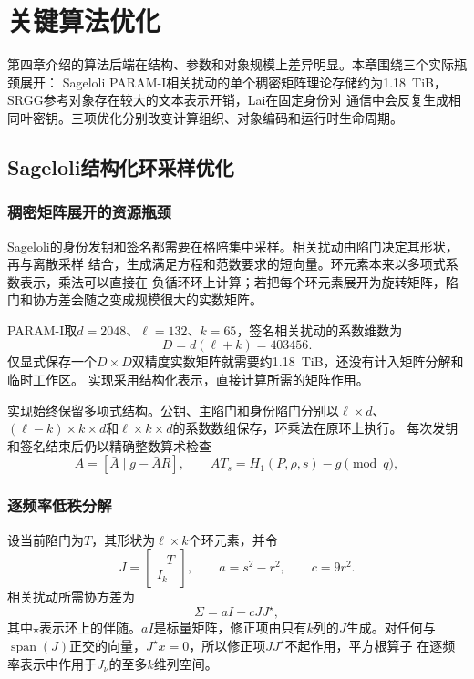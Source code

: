 \chapter{关键算法优化}
\begin{mathchapterlayout}

第四章介绍的算法后端在结构、参数和对象规模上差异明显。本章围绕三个实际瓶颈展开：
Sageloli PARAM-I相关扰动的单个稠密矩阵理论存储约为1.18~TiB，SRGG参考对象存在较大的文本表示开销，Lai在固定身份对
通信中会反复生成相同叶密钥。三项优化分别改变计算组织、对象编码和运行时生命周期。

\section{Sageloli结构化环采样优化}

\subsection{稠密矩阵展开的资源瓶颈}

Sageloli的身份发钥和签名都需要在格陪集中采样。相关扰动由陷门决定其形状，再与离散采样
结合，生成满足方程和范数要求的短向量。环元素本来以多项式系数表示，乘法可以直接在
负循环环上计算；若把每个环元素展开为旋转矩阵，陷门和协方差会随之变成规模很大的实数矩阵。

PARAM-I取$d=2048$、$\ell=132$、$k=65$，签名相关扰动的系数维数为
\[
 D=d(\ell+k)=403456.
\]
仅显式保存一个$D\times D$双精度实数矩阵就需要约1.18~TiB，还没有计入矩阵分解和临时工作区。
实现采用结构化表示，直接计算所需的矩阵作用。

实现始终保留多项式结构。公钥、主陷门和身份陷门分别以$\ell\times d$、
$(\ell-k)\times k\times d$和$\ell\times k\times d$的系数数组保存，环乘法在原环上执行。
每次发钥和签名结束后仍以精确整数算术检查
\[
 A=[\bar A\mid g-\bar AR],\qquad
 AT_s=H_1(P,\rho,s)-g\pmod q,
\]


\subsection{逐频率低秩分解}

设当前陷门为$T$，其形状为$\ell\times k$个环元素，并令
\[
 J=\begin{bmatrix}-T\\I_k\end{bmatrix},\qquad
 a=s^2-r^2,\qquad c=9r^2.
\]
相关扰动所需协方差为
\[
 \Sigma=aI-cJJ^\star,
\]
其中$\star$表示环上的伴随。$aI$是标量矩阵，修正项由只有$k$列的$J$生成。对任何与
$\operatorname{span}(J)$正交的向量，$J^\star x=0$，所以修正项$JJ^\star$不起作用，平方根算子
在逐频率表示中作用于$J_\nu$的至多$k$维列空间。


\end{mathchapterlayout}

